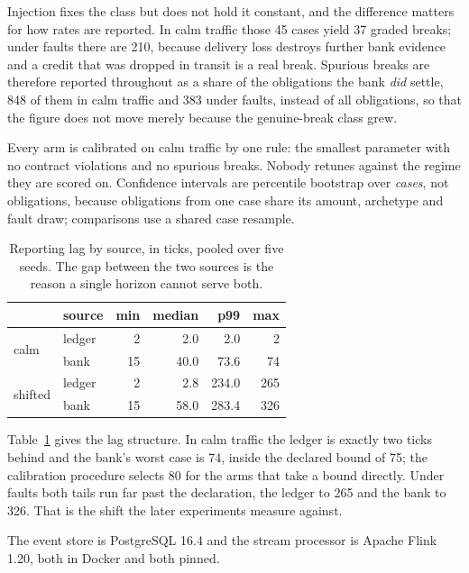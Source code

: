 \documentclass[10pt,conference]{IEEEtran}
\begin{document}
Injection fixes the class but does not hold it constant, and the difference
matters for how rates are reported. In calm traffic those 45 cases yield 37
graded breaks; under faults there are 210, because delivery loss destroys
further bank evidence and a credit that was dropped in transit is a real break.
Spurious breaks are therefore reported throughout as a share of the obligations the bank \emph{did} settle, 848 of them in calm
traffic and 383 under faults, instead of all obligations, so that the figure does not move merely
because the genuine-break class grew.

Every arm is calibrated on calm traffic by one rule: the smallest parameter with
no contract violations and no spurious breaks. Nobody retunes against the regime
they are scored on. Confidence intervals are percentile bootstrap over
\emph{cases}, not obligations, because obligations from one case share its
amount, archetype and fault draw; comparisons use a shared case resample.

\begin{table}[t]
\caption{Reporting lag by source, in ticks, pooled over five seeds. The gap
between the two sources is the reason a single horizon cannot serve both.}
\label{tab:lag}
\centering
\footnotesize
\begin{tabular}{llrrrr}
\toprule
& source & min & median & p99 & max \\
\midrule
\multirow{2}{*}{calm}   & ledger & 2 & 2.0 & 2.0 & 2 \\
                        & bank   & 15 & 40.0 & 73.6 & 74 \\
\midrule
\multirow{2}{*}{shifted}& ledger & 2 & 2.8 & 234.0 & 265 \\
                        & bank   & 15 & 58.0 & 283.4 & 326 \\
\bottomrule
\end{tabular}
\end{table}

Table~\ref{tab:lag} gives the lag structure. In calm traffic the ledger is
exactly two ticks behind and the bank's worst case is 74, inside the declared
bound of 75; the calibration procedure selects 80 for the arms that take a
bound directly. Under faults both tails run far past the declaration, the ledger to 265 and
the bank to 326. That is the shift the later experiments measure against.

The event store is PostgreSQL 16.4 and the stream processor is Apache Flink
1.20, both in Docker and both pinned.
\end{document}
